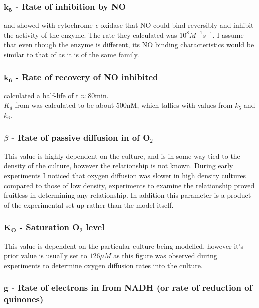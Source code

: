 \subsubsection*{$\mathbf{k_5}$ {\bf- Rate of \cbbthree{} inhibition by NO}}
\citet{Giuffre2000} and \citet{Blackmore1991} showed with cytochrome \textit{c} oxidase that NO could bind reversibly and inhibit the activity of the enzyme. The rate they calculated was $10^8 M ^{-1} s ^{-1}$. I assume that even though the enzyme is different, its NO binding characteristics would be similar to that of \cbbthree{} as it is of the same family.

\subsubsection*{$\mathbf{k_6}$ {\bf- Rate of recovery of NO inhibited \cbbthree{}}}
\citet{Giuffre2000} calculated a half-life of t\textonehalf $\approx 80 \mathrm{min}$.\\
$K_d$ from \citet{Rock2007} was calculated to be about 500nM, which tallies with values from $k_5$ and $k_6$.

\subsubsection*{$\beta$ {\bf- Rate of passive diffusion in of O$_{\textrm{2}}$}}
This value is highly dependent on the culture, and is in some way tied to the density of the culture, however the relationship is not known. During early experiments I noticed that oxygen diffusion was slower in high density cultures compared to those of low density, experiments to examine the relationship proved fruitless in determining any relationship. In addition this parameter is a product of the experimental set-up rather than the model itself.

\subsubsection*{$\mathbf{K_O}$ {\bf- Saturation O$_{\textrm{2}}$ level}}
This value is dependent on the particular culture being modelled, however it's prior value is usually set to $126\mu M$ as this figure was observed during experiments to determine oxygen diffusion rates into the culture.

\subsubsection*{$\mathbf{g}$ {\bf- Rate of electrons in from NADH (or rate of reduction of quinones)}}


